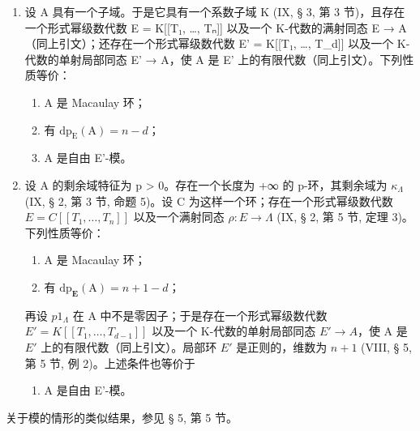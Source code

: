 \begin{enumerate}
\def\labelenumi{\alph{enumi})}
\tightlist
\item
  设 A 具有一个子域。于是它具有一个系数子域 K (IX, § 3, 第 3 节)，且存在一个形式幂级数代数 E = K{[}{[}T₁, \ldots, Tₙ{]}{]} 以及一个 K-代数的满射同态 E → A（同上引文）；还存在一个形式幂级数代数 E' = K{[}{[}T₁, \ldots, T\_d{]}{]} 以及一个 K-代数的单射局部同态 E' → A，使 A 是 E' 上的有限代数（同上引文）。下列性质等价：
  \begin{enumerate}
  \def\labelenumii{(\roman{enumii})}
  \item
    A 是 Macaulay 环；
  \item
    有 \(\mathrm{dp}_{\mathrm{E}}(\mathrm{A}) = n - d\)；
  \item
    A 是自由 E'-模。
  \end{enumerate}

\item
  设 A 的剩余域特征为 p \textgreater{} 0。存在一个长度为 +∞ 的 p-环，其剩余域为 \(\kappa_{\Lambda}\) (IX, § 2, 第 3 节, 命题 5)。设 C 为这样一个环；存在一个形式幂级数代数 \(E = C[[T_{1}, \ldots, T_{n}]]\) 以及一个满射同态 \(\rho : E \to \Lambda\) (IX, § 2, 第 5 节, 定理 3)。下列性质等价：
  \begin{enumerate}
  \def\labelenumii{(\roman{enumii})}
  \item
    A 是 Macaulay 环；
  \item
    有 \(\mathrm{dp}_{\mathbf{E}}(\mathrm{A}) = n + 1 - d\)；
  \end{enumerate}

再设 \(p1_{\Lambda}\) 在 A 中不是零因子；于是存在一个形式幂级数代数 \(E' = K[[T_1, \ldots, T_{d-1}]]\) 以及一个 K-代数的单射局部同态 \(E' \to A\)，使 A 是 \(E'\) 上的有限代数（同上引文）。局部环 \(E'\) 是正则的，维数为 \(n+1\) (VIII, § 5, 第 5 节, 例 2)。上述条件也等价于

  \begin{enumerate}
  \def\labelenumii{(\roman{enumii})}
  \setcounter{enumii}{2}
  \tightlist
  \item
    A 是自由 E'-模。
  \end{enumerate}
\end{enumerate}

关于模的情形的类似结果，参见 § 5, 第 5 节。

